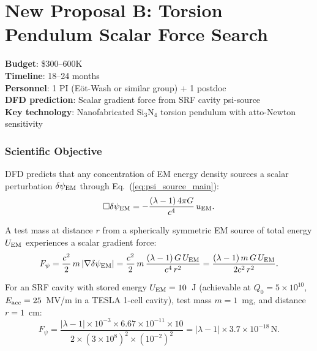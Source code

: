 \documentclass[11pt]{article}
\newcommand{\ee}[1]{\times 10^{#1}}
\newcommand{\dpsi}{\delta\psi}
\begin{document}
\part{New Proposal B: Torsion Pendulum Scalar Force Search}
\label{part:torsion}

\label{sec:torsion}

\begin{tcolorbox}[colback=purple!3!white, colframe=newcolor,
  title=\textbf{NEW PROPOSAL B --- TORSION PENDULUM SCALAR FORCE}]
\textbf{Budget}: \$300--600K\\
\textbf{Timeline}: 18--24 months\\
\textbf{Personnel}: 1 PI (E\"ot-Wash or similar group) + 1 postdoc\\
\textbf{DFD prediction}: Scalar gradient force from SRF cavity psi-source\\
\textbf{Key technology}: Nanofabricated Si$_3$N$_4$ torsion pendulum
with atto-Newton sensitivity
\end{tcolorbox}

\section{Scientific Objective}

DFD predicts that any concentration of EM energy density sources a
scalar perturbation $\dpsi_{\rm EM}$ through Eq.~(\ref{eq:psi_source_main}):
\begin{equation}
\Box\dpsi_{\rm EM} = -\frac{(\lambda-1)\,4\pi G}{c^4}\,u_{\rm EM}.
\label{eq:psi_source_main}
\end{equation}

A test mass at distance $r$ from a spherically symmetric EM source of
total energy $U_{\rm EM}$ experiences a scalar gradient force:
\begin{equation}
F_\psi = \frac{c^2}{2}\,m\,|\nabla\dpsi_{\rm EM}|
= \frac{c^2}{2}\,m\,\frac{(\lambda-1)\,G\,U_{\rm EM}}{c^4\,r^2}
= \frac{(\lambda-1)\,m\,G\,U_{\rm EM}}{2c^2\,r^2}.
\label{eq:F_psi}
\end{equation}

For an SRF cavity with stored energy $U_{\rm EM} = 10$~J (achievable
at $Q_0 = 5\ee{10}$, $E_{\rm acc} = 25$~MV/m in a TESLA 1-cell cavity),
test mass $m = 1$~mg, and distance $r = 1$~cm:
\begin{equation}
F_\psi = \frac{|\lambda-1| \times 10^{-3} \times 6.67\ee{-11} \times 10}
{2 \times (3\ee{8})^2 \times (10^{-2})^2}
= |\lambda-1| \times 3.7\ee{-18}\,\text{N}.
\end{equation}
\end{document}
